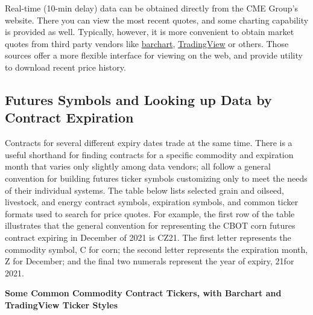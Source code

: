 \documentclass[
]{book}
\begin{document}
Real-time (10-min delay) data can be obtained directly from the CME Group's website. There you can view the most recent quotes, and some charting capability is provided as well. Typically, however, it is more convenient to obtain market quotes from third party vendors like \href{http://www.barchart.com/futures/marketoverview}{barchart}, \href{https://www.tradingview.com/}{TradingView} or others. Those sources offer a more flexible interface for viewing on the web, and provide utility to download recent price history.

\hypertarget{futures-symbols-and-looking-up-data-by-contract-expiration}{%
\subsection{Futures Symbols and Looking up Data by Contract Expiration}\label{futures-symbols-and-looking-up-data-by-contract-expiration}}

Contracts for several different expiry dates trade at the same time. There is a useful shorthand for finding contracts for a specific commodity and expiration month that varies only slightly among data vendors; all follow a general convention for building futures ticker symbols customizing only to meet the needs of their individual systems. The table below lists selected grain and oilseed, livestock, and energy contract symbols, expiration symbols, and common ticker formats used to search for price quotes. For example, the first row of the table illustrates that the general convention for representing the CBOT corn futures contract expiring in December of 2021 is CZ21. The first letter represents the commodity symbol, C for corn; the second letter represents the expiration month, Z for December; and the final two numerals represent the year of expiry, 21for 2021.

\textbf{Some Common Commodity Contract Tickers, with Barchart and TradingView Ticker Styles}
\end{document}

